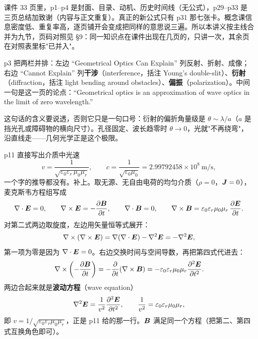 \documentclass[10pt]{ctexart}
\begin{document}

课件 33 页里，p1--p4 是封面、目录、动机、历史时间线（无公式），p29--p33 是三页总结加致谢（内容与正文重复）。真正的新公式只有 p31 那七张卡。概念课信息密度低、重复率高，逐页铺开会变成把同样的意思说三遍。所以本讲义按主线合并为九节，页码对照见 §9：同一知识点在课件出现在几页的，只讲一次，其余页在对照表里标"已并入"。



p3 把两栏并排：左边 “Geometrical Optics Can Explain” 列反射、折射、成像；右边 “Cannot Explain” 列\textbf{干涉}（interference，括注 Young's double-slit）、\textbf{衍射}（diffraction，括注 light bending around obstacles）、\textbf{偏振}（polarization）。中间一句是这一页的论点：“Geometrical optics is an approximation of wave optics in the limit of zero wavelength.”

这句话的含义要说透，否则它只是一句口号：衍射的偏折角量级是 $\theta\sim\lambda/a$（$a$ 是挡光孔或障碍物的横向尺寸）。孔径固定、波长趋零时 $\theta\to0$，光就"不再绕弯"，沿直线走——几何光学正是这个极限。



p11 直接写出介质中光速
\[
v=\frac{1}{\sqrt{\varepsilon_0\varepsilon_r\,\mu_0\mu_r}},
\qquad
c=\frac{1}{\sqrt{\varepsilon_0\mu_0}}=2.99792458\times10^{8}\ \text{m/s},
\]
一个字的推导都没有。补上。取无源、无自由电荷的均匀介质（$\rho=0$，$\boldsymbol{J}=0$），麦克斯韦方程组写成
\[
\nabla\cdot\boldsymbol{E}=0,\qquad
\nabla\times\boldsymbol{E}=-\frac{\partial\boldsymbol{B}}{\partial t},\qquad
\nabla\cdot\boldsymbol{B}=0,\qquad
\nabla\times\boldsymbol{B}=\varepsilon_0\varepsilon_r\mu_0\mu_r\,\frac{\partial\boldsymbol{E}}{\partial t}.
\]
对第二式两边取旋度，左边用矢量恒等式展开：
\[
\nabla\times(\nabla\times\boldsymbol{E})=\nabla(\nabla\cdot\boldsymbol{E})-\nabla^2\boldsymbol{E}=-\nabla^2\boldsymbol{E} ,
\]
第一项为零是因为 $\nabla\cdot\boldsymbol{E}=0$。右边交换时间与空间导数，再把第四式代进去：
\[
\nabla\times\left(-\frac{\partial\boldsymbol{B}}{\partial t}\right)
=-\frac{\partial}{\partial t}(\nabla\times\boldsymbol{B})
=-\varepsilon_0\varepsilon_r\mu_0\mu_r\frac{\partial^2\boldsymbol{E}}{\partial t^2}.
\]
两边合起来就是\textbf{波动方程}（wave equation）
\[
\nabla^2\boldsymbol{E}=\frac{1}{v^2}\frac{\partial^2\boldsymbol{E}}{\partial t^2},
\qquad
\frac{1}{v^2}=\varepsilon_0\varepsilon_r\mu_0\mu_r ,
\]
即 $v=1/\sqrt{\varepsilon_0\varepsilon_r\mu_0\mu_r}$，正是 p11 给的那一行。$\boldsymbol{B}$ 满足同一个方程（把第二、第四式互换角色即可）。
\end{document}

